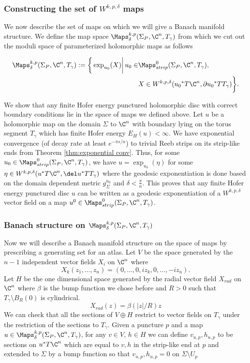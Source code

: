 \subsubsection{Constructing the set of $W^{k,p,\delta}$ maps }
We now describe the set of maps on which we will give a Banach manifold structure. We define the map space $\Maps^{k,p}_\delta(\Sigma_P, \C^n , T_\gamma)$ from which we cut out the moduli space of parameterized holomorphic maps as follows

\begin{align*}
    \Maps^{k,p}_\delta (\Sigma_P, \C^n, T_\gamma) := 
\bigg\{ \exp_{u_0} (X) \bigg|\,u_0 \in &\Maps^0_{strip}(\Sigma_P, \C^n , T_\gamma),\,\,\\& X\in  W^{k,p,\delta}({u_0}^* T\C^n,\partial {u_0}^* TT_\gamma) \bigg\}.
\end{align*} 


We show that any finite Hofer energy punctured holomorphic disc with correct boundary conditions lie in the space of maps we defined above. Let $u$ be a holomorphic map  on the domain $\Sigma$ to $\C^n$ with boundary lying on the torus segment $T_\gamma$ which has finite Hofer energy $E_H(u) < \infty$. We have exponential convergence (of decay rate at least $e^{-\pi s/n}$) to trivial Reeb strips on its strip-like ends from Theorem \ref{thm:exponential conv}. Thus, for some $u_0 \in \Maps^0_{strip}(\Sigma_P, \C^n , T_\gamma)$, we have $u=\exp_{u_0}(\eta)$ for some $\eta \in W^{k,p,\delta} (u^*T\C^n,\del  u^* TT_\gamma)$ where the geodesic exponentiation is done based on the domain dependent metric $g^{u_0}_\Sigma$  and $ \delta  < \frac{\pi}{n} $. This proves that any finite Hofer energy punctured disc $u$ can be written as a geodesic exponentiation of a $W^{k,p,\delta}$ vector field on a map $u^0 \in \Maps^0_{strip}(\Sigma_P, \C^n , T_\gamma) $.

\subsubsection{ Banach structure on $\Maps^{k,p}_\delta(\Sigma_P, \C^n , T_\gamma)$}


Now we will describe a Banach manifold structure on the space of maps by prescribing a generating set for an atlas. Let $V$ be the space generated by the  $n-1$ independent vector fields $X_i$ on $\C^n$  where  
$$X_k(z_1,\dots,z_n) = (0,\dots,0, iz_k,0,\dots,-i z_n).$$
Let $H$ be the one dimensional space generated by the radial vector field $X_{rad}$ on $\C^n$ where $\beta$ is the bump function we chose before and $R>0$ such that $T_\gamma \setminus B_R(0)$ is cylindrical.
$$X_{rad}(z)= \beta(|z|/R)z $$
\noindent We can check that all the sections of  $V \oplus H$ restrict to vector fields on $T_\gamma$ under the restriction of the sections to $T_\gamma$. Given a puncture $p$ and a map $u\in \Maps^{k,p}_\delta(\Sigma_P, \C^n , T_\gamma)$, for any $v\in V $, $h\in H$ we can define $v_{u,p},h_{u,p}$ to be sections on $u^*T\C^n$ which are equal to $v,h$ in the strip-like end at $p$ and extended to $\Sigma$  by a bump function so that $v_{u,p},h_{u,p} = 0$ on $\Sigma \setminus U_p$


